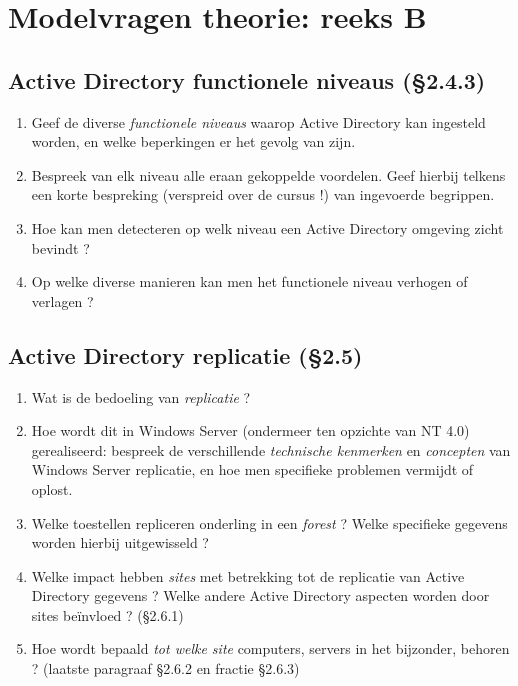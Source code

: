 \documentclass{report}
\begin{document}
	\chapter{Modelvragen theorie: reeks B}
	\section{Active Directory functionele niveaus {\color{red}(§2.4.3)}}
	\begin{enumerate}
		\item Geef de diverse \textit{functionele niveaus} waarop Active Directory kan ingesteld worden, en welke beperkingen er het gevolg van zijn.
		\item Bespreek van elk niveau alle eraan gekoppelde voordelen. Geef hierbij telkens een korte bespreking {\color{red}(verspreid over de cursus !)} van ingevoerde begrippen.
		
		\item Hoe kan men detecteren op welk niveau een Active Directory omgeving zicht bevindt ?
		
		\item Op welke diverse manieren kan men het functionele niveau verhogen of verlagen ?
	\end{enumerate}
	
	\section{Active Directory replicatie {\color{red}(§2.5)}}
	\begin{enumerate}
		\item Wat is de bedoeling van \textit{replicatie} ?
		
		\item Hoe wordt dit in Windows Server (ondermeer ten opzichte van NT 4.0) gerealiseerd: bespreek de verschillende \textit{technische kenmerken} en \textit{concepten} van Windows Server replicatie, en hoe men specifieke problemen vermijdt of oplost.
		
		\item Welke toestellen repliceren onderling in een \textit{forest} ? Welke specifieke gegevens worden hierbij uitgewisseld ?
		
		\item Welke impact hebben \textit{sites} met betrekking tot de replicatie van Active Directory gegevens ? Welke andere Active Directory aspecten worden door sites beïnvloed ? {\color{red}(§2.6.1)}
		
		\item Hoe wordt bepaald \textit{tot welke site} computers, servers in het bijzonder, behoren ? {\color{red}(laatste paragraaf §2.6.2 en fractie §2.6.3)}
	\end{enumerate}
\end{document}
